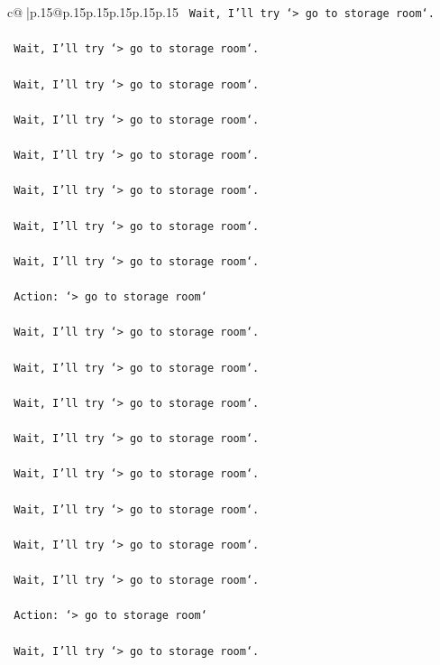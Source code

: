 \documentclass{article}
\begin{document}
{\begin{supertabular}{c@{$\;$}|p{.15\linewidth}@{}p{.15\linewidth}p{.15\linewidth}p{.15\linewidth}p{.15\linewidth}p{.15\linewidth}}
{{{\texttt{    Wait, I'll try `> go to storage room`.} \\
\\ 
\texttt{    Wait, I'll try `> go to storage room`.} \\
\\ 
\texttt{    Wait, I'll try `> go to storage room`.} \\
\\ 
\texttt{    Wait, I'll try `> go to storage room`.} \\
\\ 
\texttt{    Wait, I'll try `> go to storage room`.} \\
\\ 
\texttt{    Wait, I'll try `> go to storage room`.} \\
\\ 
\texttt{    Wait, I'll try `> go to storage room`.} \\
\\ 
\texttt{    Wait, I'll try `> go to storage room`.} \\
\\ 
\texttt{    Action: `> go to storage room`} \\
\\ 
\texttt{    Wait, I'll try `> go to storage room`.} \\
\\ 
\texttt{    Wait, I'll try `> go to storage room`.} \\
\\ 
\texttt{    Wait, I'll try `> go to storage room`.} \\
\\ 
\texttt{    Wait, I'll try `> go to storage room`.} \\
\\ 
\texttt{    Wait, I'll try `> go to storage room`.} \\
\\ 
\texttt{    Wait, I'll try `> go to storage room`.} \\
\\ 
\texttt{    Wait, I'll try `> go to storage room`.} \\
\\ 
\texttt{    Wait, I'll try `> go to storage room`.} \\
\\ 
\texttt{    Action: `> go to storage room`} \\
\\ 
\texttt{    Wait, I'll try `> go to storage room`.} \\
\\ 
}}}
\end{supertabular}}
\end{document}

